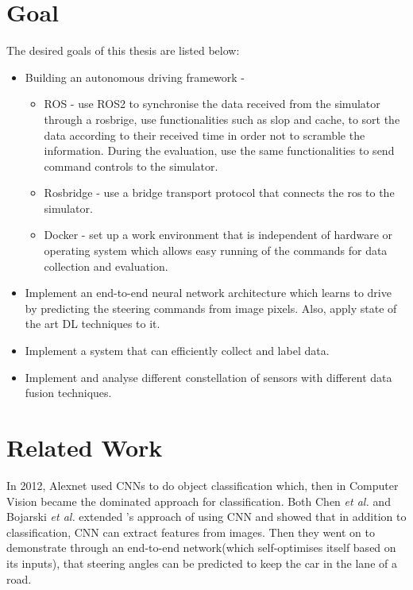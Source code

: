 \section{Goal}
    The desired goals of this thesis are listed below:

\begin{itemize}
    \item Building an autonomous driving framework -
        \begin{itemize}
        \item ROS - use ROS2 to synchronise the data received from the simulator through a
            rosbrige, use functionalities such as slop and cache, to sort the data according to
            their received time in order not to scramble the information. During the evaluation,
            use the same functionalities to send command controls to the simulator.
        \item Rosbridge - use a bridge transport protocol that connects the ros to the simulator.
        \item Docker - set up a work environment that is independent of hardware or
            operating system which allows easy running of the commands for data collection
            and evaluation.
        \end{itemize}
    \item Implement an end-to-end neural network architecture which learns to drive by
        predicting the steering commands from image pixels. Also, apply state of
        the art DL techniques to it.
    \item Implement a system that can efficiently collect and label data.
    \item Implement and analyse different constellation of sensors with different data
        fusion techniques.
\end{itemize}

\section{Related Work}
In 2012, Alexnet \cite{Alexnet2012} used CNNs to do object classification which, then
in Computer Vision became the dominated approach for classification. Both Chen \textit{et
al.} \cite{chen2017} and Bojarski \textit{et al.} \cite{bojarski2016end} extended
\cite{Alexnet2012}'s approach of using CNN and showed that in addition to classification, CNN can
extract features from images. Then they went on to demonstrate through an end-to-end
network(which self-optimises itself based on its inputs), that steering angles can be
predicted to keep the car in the lane of a road.

